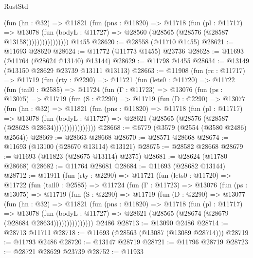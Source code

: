 \begin{lexlean}{RustStd}
\begin{coremodule}
                      (fun (hn : @32) =>
                      @11821
                        (fun (pns : @11820) =>
                        @11718
                          (fun (pl : @11717) =>
                          @13078
                            (fun (bodyL : @11727) =>
                            @28560 (@28565 (@28576 (@28587 @13158))))))))))))))))
    @1455
@28620 := @28558 (@11710 @1455)
@28621 := @11693 @28620
@28624 := @11772 (@11773 @1455) @23736
@28628 := @11693 (@11764 (@28624 @13140) @13144)
@28629 := @11798 @1455
@28634 := @13149 (@13150 @28629 @23739 @13111 @13113)
@28663 := @11908
    (fun (rc : @11717) =>
    @11719
      (fun (rty : @2290) =>
      @11721
        (fun (lets0 : @11720) =>
        @11722
          (fun (tail0 : @2585) =>
          @11724
            (fun (Γ : @11723) =>
            @13076
              (fun (ps : @13075) =>
              @11719
                (fun (S : @2290) =>
                @11719
                  (fun (D : @2290) =>
                  @13077
                    (fun (hn : @32) =>
                    @11821
                      (fun (pns : @11820) =>
                      @11718
                        (fun (pl : @11717) =>
                        @13078
                          (fun (bodyL : @11727) =>
                          @28621 (@28565 (@28576 (@28587 (@28628 @28634))))))))))))))))
@28668 := @6779 (@3579 (@2554 (@3580 @2486) @2564))
@28669 := @28663 @28668
@28670 := @28571 @28668
@28674 := @11693 (@13100 (@28670 @13114) @13121)
@28675 := @28582 @28668
@28679 := @11693 (@11823 (@28675 @13114) @2375)
@28681 := @28624 (@11780 @28668)
@28682 := @11764 @28681
@28684 := @11693 (@28682 @13144)
@28712 := @11911
    (fun (rty : @2290) =>
    @11721
      (fun (lets0 : @11720) =>
      @11722
        (fun (tail0 : @2585) =>
        @11724
          (fun (Γ : @11723) =>
          @13076
            (fun (ps : @13075) =>
            @11719
              (fun (S : @2290) =>
              @11719
                (fun (D : @2290) =>
                @13077
                  (fun (hn : @32) =>
                  @11821
                    (fun (pns : @11820) =>
                    @11718
                      (fun (pl : @11717) =>
                      @13078
                        (fun (bodyL : @11727) =>
                        @28621 (@28565 (@28674 (@28679 (@28684 @28634)))))))))))))))
    @2486
@28713 := @13090 @2486
@28714 := @28713 @11711
@28718 := @11693 (@28563 (@13087 (@13089 @28714)))
@28719 := @11793 @2486
@28720 := @13147 @28719
@28721 := @11796 @28719
@28723 := @28721 @28629 @23739
@28752 := @11933

\end{coremodule}
\end{lexlean}
